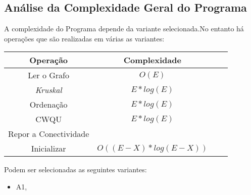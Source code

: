 \documentclass[14pt]{article}
\begin{document}
    \subsection[gencomplexity]{Análise da Complexidade Geral do Programa}
    A complexidade do Programa depende da variante selecionada.No entanto há operações que são realizadas em várias as variantes:
    \begin{table}[h!]
        \centering
        \begin{tabular}{|| c || c || c || c ||}
            \hline
            Operação & Complexidade\\ [0.5ex]
            \hline\hline
            Ler o Grafo & \(O(E)\) \\
            \emph{Kruskal} &\(E*log(E)\) \\
            Ordenação & \(E*log(E)\) \\
            CWQU & \(E*log(E)\)\\
            \hline\hline
           Repor a Conectividade\\
            Inicializar & \(O((E-X)*log(E-X))\)\\
            \hline
        \end{tabular}
    \end{table}

    Podem ser selecionadas as seguintes variantes:
    \begin{itemize}
        \item A1,
    \end{itemize}
\end{document}
